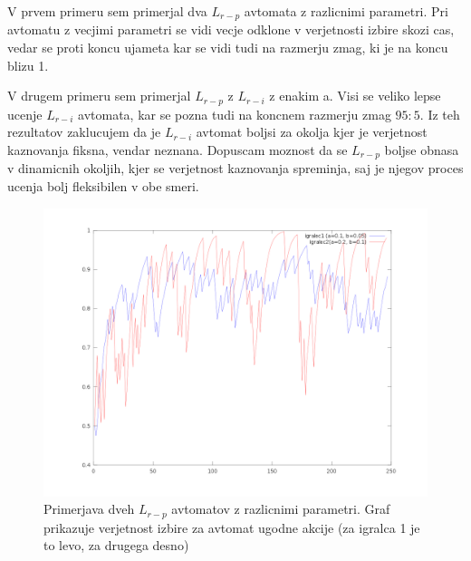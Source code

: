 \documentclass[10pt,a4paper]{report}
\begin{document}
V prvem primeru sem primerjal dva $L_{r-p}$ avtomata z razlicnimi parametri. Pri avtomatu z vecjimi parametri se vidi vecje odklone v verjetnosti izbire skozi cas, vedar se proti koncu ujameta kar se vidi tudi na razmerju zmag, ki je na koncu blizu 1.

V drugem primeru sem primerjal $L_{r-p}$ z $L_{r-i}$ z enakim a. Visi se veliko lepse ucenje $L_{r-i}$ avtomata, kar se pozna tudi na koncnem razmerju zmag $95:5$. Iz teh rezultatov zaklucujem da je $L_{r-i}$ avtomat boljsi za okolja kjer je verjetnost kaznovanja fiksna, vendar neznana. Dopuscam moznost da se $L_{r-p}$ boljse obnasa v dinamicnih okoljih, kjer se verjetnost kaznovanja spreminja, saj je njegov proces ucenja bolj fleksibilen v obe smeri.

\begin{figure}[h!]
\begin{center}
\includegraphics[scale=0.4]{fig_lrp.png} 
\end{center}
\caption{Primerjava dveh $L_{r-p}$ avtomatov z razlicnimi parametri. Graf prikazuje verjetnost izbire za avtomat ugodne akcije (za igralca 1 je to levo, za drugega desno)}
\end{figure}
\end{document}
